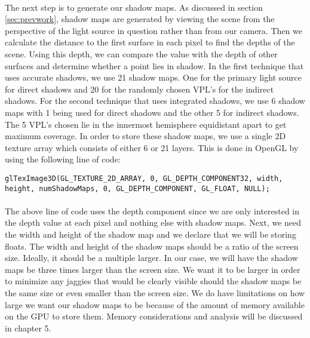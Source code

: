 \paragraph{}
The next step is to generate our shadow maps.  As discussed in section \ref{sec:prevwork}, shadow maps are generated by viewing the scene from the perspective of the light source in question rather than from our camera.  Then we calculate the distance to the first surface in each pixel to find the depths of the scene.  Using this depth, we can compare the value with the depth of other surfaces and determine whether a point lies in shadow.  In the first technique that uses accurate shadows, we use 21 shadow maps. One for the primary light source for direct shadows and 20 for the randomly chosen VPL's for the indirect shadows.  For the second technique that uses integrated shadows, we use 6 shadow maps with 1 being used for direct shadows and the other 5 for indirect shadows.  The 5 VPL's chosen lie in the innermost hemisphere equidistant apart to get maximum coverage.  In order to store these shadow maps, we use a single 2D texture array which consists of either 6 or 21 layers.  This is done in OpenGL by using the following line of code:

\begin{lstlisting}
glTexImage3D(GL_TEXTURE_2D_ARRAY, 0, GL_DEPTH_COMPONENT32, width, 
height, numShadowMaps, 0, GL_DEPTH_COMPONENT, GL_FLOAT, NULL);
\end{lstlisting}
\paragraph{}
The above line of code uses the depth component since we are only interested in the depth value at each pixel and nothing else with shadow maps.  Next, we need the width and height of the shadow map and we declare that we will be storing floats.  The width and height of the shadow maps should be a ratio of the screen size.  Ideally, it should be a multiple larger.  In our case, we will have the shadow maps be three times larger than the screen size.  We want it to be larger in order to minimize any jaggies that would be clearly visible should the shadow maps be the same size or even smaller than the screen size.  We do have limitations on how large we want our shadow maps to be because of the amount of memory available on the GPU to store them.  Memory considerations and analysis will be discussed in chapter 5.  

